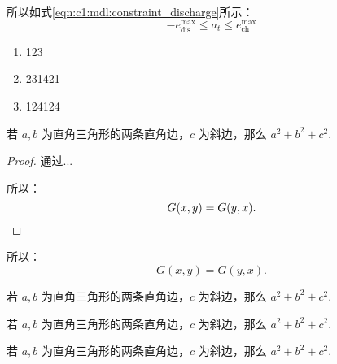 所以如式\eqref{eqn:c1:mdl:constraint_discharge}所示：
\begin{equation}
    -e^{\max}_\text{dis} \leq a_t \leq e^{\max}_\text{ch}
\end{equation}

\begin{enumerate}
    \item 123
    \item 231421
    \item 124124
\end{enumerate}

\begin{theorem}[勾股定理]
    若 $a,b$ 为直角三角形的两条直角边，$c$ 为斜边，那么 $a^2 + b^2 + c^2.$
\end{theorem}

\begin{proof}
{
    通过...

    所以：
    \begin{equation*}
        G(x, y) = G(y, x).  \qedhere
    \end{equation*}
}
\end{proof}

\begin{proposition}
    所以：
    \begin{equation*}
        G(x, y) = G(y, x).
    \end{equation*}
\end{proposition}


\begin{conjecture}[勾股定理]
    若 $a,b$ 为直角三角形的两条直角边，$c$ 为斜边，那么 $a^2 + b^2 + c^2.$
\end{conjecture}

\begin{axiom}[勾股定理]
    若 $a,b$ 为直角三角形的两条直角边，$c$ 为斜边，那么 $a^2 + b^2 + c^2.$
\end{axiom}

\begin{definition}[勾股定理]
    若 $a,b$ 为直角三角形的两条直角边，$c$ 为斜边，那么 $a^2 + b^2 + c^2.$
\end{definition}




